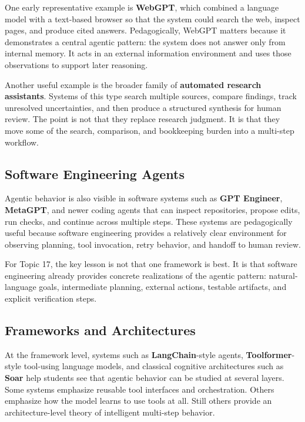 \documentclass[12pt]{article}
\begin{document}
One early representative example is \textbf{WebGPT}, which combined a language model with a text-based browser so that the system could search the web, inspect pages, and produce cited answers. Pedagogically, WebGPT matters because it demonstrates a central agentic pattern: the system does not answer only from internal memory. It acts in an external information environment and uses those observations to support later reasoning.

Another useful example is the broader family of \textbf{automated research assistants}. Systems of this type search multiple sources, compare findings, track unresolved uncertainties, and then produce a structured synthesis for human review. The point is not that they replace research judgment. It is that they move some of the search, comparison, and bookkeeping burden into a multi-step workflow.

\subsection{Software Engineering Agents}

Agentic behavior is also visible in software systems such as \textbf{GPT Engineer}, \textbf{MetaGPT}, and newer coding agents that can inspect repositories, propose edits, run checks, and continue across multiple steps. These systems are pedagogically useful because software engineering provides a relatively clear environment for observing planning, tool invocation, retry behavior, and handoff to human review.

For Topic 17, the key lesson is not that one framework is best. It is that software engineering already provides concrete realizations of the agentic pattern: natural-language goals, intermediate planning, external actions, testable artifacts, and explicit verification steps.

\subsection{Frameworks and Architectures}

At the framework level, systems such as \textbf{LangChain}-style agents, \textbf{Toolformer}-style tool-using language models, and classical cognitive architectures such as \textbf{Soar} help students see that agentic behavior can be studied at several layers. Some systems emphasize reusable tool interfaces and orchestration. Others emphasize how the model learns to use tools at all. Still others provide an architecture-level theory of intelligent multi-step behavior.
\end{document}
